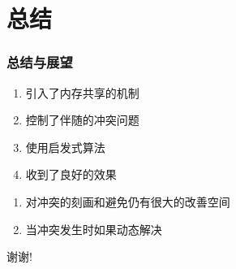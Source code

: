 \documentclass[slidestop,compress,mathserif,blue,12pt,adobefonts]{beamer}
\begin{document}
\section{总结}
  \begin{frame}
    \frametitle{总结与展望}
    \begin{enumerate}
    \item 引入了内存共享的机制
    \item 控制了伴随的冲突问题
    \item 使用启发式算法
    \item 收到了良好的效果
    \end{enumerate}

    \begin{enumerate}
    \item 对冲突的刻画和避免仍有很大的改善空间
    \item 当冲突发生时如果动态解决
    \end{enumerate}

  \end{frame}

  \begin{frame}
    \vspace{4em}
    \begin{center}
      {\Huge 谢谢!}      
    \end{center}
  \end{frame}
\end{document}
